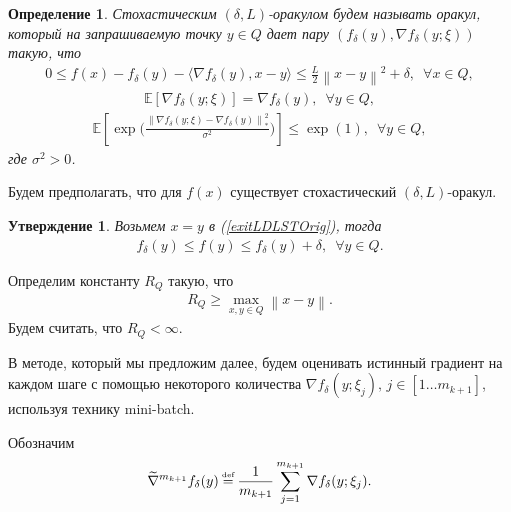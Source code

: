 \documentclass[11pt,a4]{article}
\newcommand{\norm}[1]{\left\lVert#1\right\rVert}
\newtheorem{definition}{Определение}
\newtheorem{statement}{Утверждение}
\newcommand\myeq{\mathrel{\stackrel{\makebox[0pt]{\mbox{\normalfont\tiny def}}}{=}}}
\begin{document}
\begin{definition}
\leavevmode
\label{defdeltaLstoch}
Стохастическим $(\delta, L)$-оракулом будем называть оракул, который на запрашиваемую точку $y \in Q$ дает пару $\left(f_\delta(y), \nabla f_\delta(y;\xi)\right)$ такую, что
\begin{gather}
\label{exitLDLSTOrig}
0 \leq f(x) - f_\delta(y) - \langle\nabla f_\delta(y), x - y\rangle \leq \frac{L}{2}\norm{x - y}^2 + \delta ,\,\,\, \forall x \in Q,
\end{gather}
\begin{gather}
\label{ST1}
\mathbb{E}\left[\nabla f_\delta(y;\xi)\right] = \nabla f_\delta(y),\,\,\, \forall y \in Q,
\end{gather}
\begin{gather}
\label{ST2}
\mathbb{E}\left[\exp\Bigg(\frac{\norm{\nabla f_\delta(y;\xi) - \nabla f_\delta(y)}^2_*}{\sigma^2}\Bigg)\right] \leq \exp(1),\,\,\, \forall y \in Q,
\end{gather}
где $\sigma^2 > 0$.
\end{definition}
Будем предполагать, что для $f(x)$ существует стохастический $(\delta, L)$-оракул.

\begin{statement}

Возьмем $x = y$ в (\ref{exitLDLSTOrig}), тогда
\begin{gather}
\label{exitLDLOrig2}
f_\delta(y) \leq f(y) \leq f_\delta(y) + \delta,\,\,\,\forall y \in Q.
\end{gather}
\end{statement}

Определим константу $R_Q$ такую, что
\begin{align}
R_Q \geq \max_{x,y \in Q}\norm{x - y}.
\end{align} Будем считать, что $R_Q < \infty$.

В методе, который мы предложим далее, будем оценивать истинный градиент на каждом шаге с помощью некоторого количества $\nabla f_\delta(y;\xi_j),\, j \in [1\dots m_{k+1}]$, используя технику mini-batch.

Обозначим
\begin{gather}
\widetilde{\nabla}^{m_{k+1}} f_\delta(y) \myeq \frac{1}{m_{k+1}}\sum_{j=1}^{m_{k+1}}\nabla f_\delta(y;\xi_j).
\end{gather}

\iffalse
Пусть $\omega(x)$ -- произвольная гладкая, 1-сильно выпуклая функция относительно $\norm{\cdot}_*$ при $\norm{x}_* \leq 1$. Причем $\omega(0) = 0$ и $\nabla \omega(0) = 0$. Обозначим $\kappa \myeq \max_{x:\norm{x}_*\leq1}\sqrt{2\omega(x)}$. Стоит сразу отметить, что для случая, когда $\norm{\cdot}_* = \norm{\cdot}_2$, можно взять $\omega(x) = \frac{1}{2}\norm{x}_2^2$, тогда $\kappa = 1$. В более общем случае $\kappa$ уже будет зависеть от $n$, но стоит отметить, что, как правило, $\kappa \leq \sqrt{2\ln n}$ \cite{gasnikov2017universal}.
\fi
\end{document}
